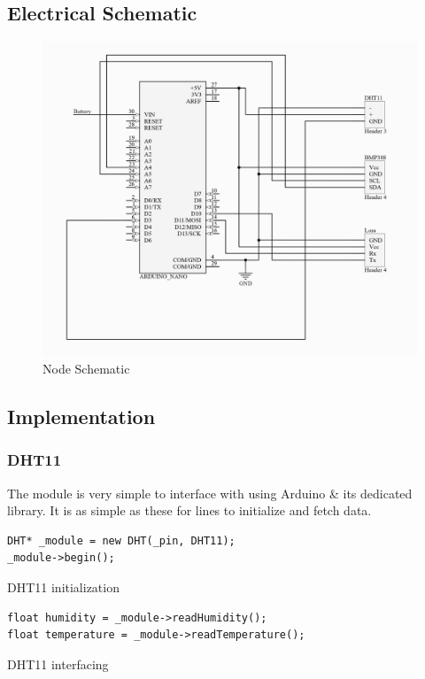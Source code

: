 \subsection{Electrical Schematic}
\begin{figure}[H]
    \centering
    \includegraphics[width=.9\textwidth]{images/VMware Horizon_230508_235208_page-0001.jpg}
    \caption{Node Schematic}
\end{figure}

\subsection{Implementation}

\subsubsection{DHT11}
The module is very simple to interface with using Arduino \& its dedicated library. It is as simple as these for lines to initialize and fetch data.
\begin{code}
    \begin{verbatim}
DHT* _module = new DHT(_pin, DHT11);
_module->begin();
    \end{verbatim}
    \caption{DHT11 initialization}
\end{code}
\begin{code}
    \begin{verbatim}
float humidity = _module->readHumidity();
float temperature = _module->readTemperature();
    \end{verbatim}
    \caption{DHT11 interfacing}
\end{code}


